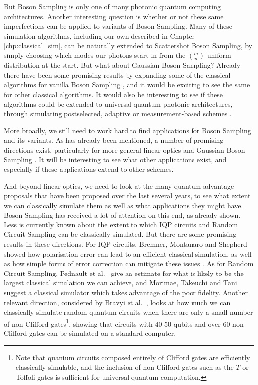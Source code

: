 But Boson Sampling is only one of many photonic quantum computing architectures. Another interesting question is whether or not these same imperfections can be applied to variants of Boson Sampling. Many of these simulation algorithms, including our own described in Chapter \ref{chp:classical_sim}, can be naturally extended to Scattershot Boson Sampling, by simply choosing which modes our photons start in from the $\binom{m}{n}$ uniform distribution at the start. But what about Gaussian Boson Sampling? Already there have been some promising results by expanding some of the classical algorithms for vanilla Boson Sampling \cite{qi2019, quesada2019, wu2019, renema2019}, and it would be exciting to see the same for other classical algorithms. It would also be interesting to see if these algorithms could be extended to universal quantum photonic architectures, through simulating postselected, adaptive or measurement-based schemes \cite{knill2001, gimenosegovia2015}.

More broadly, we still need to work hard to find applications for Boson Sampling and its variants. As has already been mentioned, a number of promising directions exist, particularly for more general linear optics \cite{sparrow2018} and Gaussian Boson Sampling \cite{huh2015, bradler2018, schuld2019}. It will be interesting to see what other applications exist, and especially if these applications extend to other schemes.

And beyond linear optics, we need to look at the many quantum advantage proposals that have been proposed over the last several years, to see what extent we can classically simulate them as well as what applications they might have. Boson Sampling has received a lot of attention on this end, as already shown. Less is currently known about the extent to which IQP circuits and Random Circuit Sampling can be classically simulated. But there are some promising results in these directions. For IQP circuits, Bremner, Montanaro and Shepherd showed how polarisation error can lead to an efficient classical simulation, as well as how simple forms of error correction can mitigate these issues \cite{bremner2017}. As for Random Circuit Sampling, Pednault et al.~\cite{pednault2019} give an estimate for what is likely to be the largest classical simulation we can achieve, and Morimae, Takeuchi and Tani \cite{morimae2019google} suggest a classical simulator which takes advantage of the poor fidelity. Another relevant direction, considered by Bravyi et al.~\cite{bravyi2019}, looks at how much we can classically simulate random quantum circuits when there are only a small number of non-Clifford gates\footnote{Note that quantum circuits composed entirely of Clifford gates are efficiently classically simulable, and the inclusion of non-Clifford gates such as the $T$ or Toffoli gates is sufficient for universal quantum computation.}, showing that circuits with 40-50 qubits and over 60 non-Clifford gates can be simulated on a standard computer.

